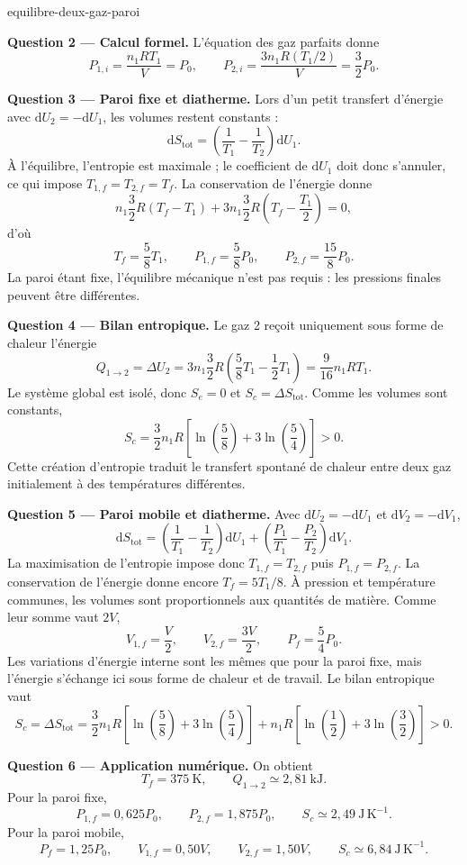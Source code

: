 \begin{exo}{equilibre-deux-gaz-paroi}
\begin{solution}
\textbf{Question 2 --- Calcul formel.} L'équation des gaz parfaits donne
\[
P_{1,i}=\frac{n_1RT_1}{V}=P_0,
\qquad
P_{2,i}=\frac{3n_1R(T_1/2)}{V}=\frac32P_0.
\]

\textbf{Question 3 --- Paroi fixe et diatherme.} Lors d'un petit transfert
d'énergie avec $\mathrm{d}U_2=-\mathrm{d}U_1$, les volumes restent constants :
\[
\mathrm{d}S_{\mathrm{tot}}
=\left(\frac1{T_1}-\frac1{T_2}\right)\mathrm{d}U_1.
\]
À l'équilibre, l'entropie est maximale ; le coefficient de
$\mathrm{d}U_1$ doit donc s'annuler, ce qui impose
$T_{1,f}=T_{2,f}=T_f$. La conservation de l'énergie donne
\[
n_1\frac32R(T_f-T_1)
+3n_1\frac32R\left(T_f-\frac{T_1}{2}\right)=0,
\]
d'où
\[
T_f=\frac58T_1,
\qquad
P_{1,f}=\frac58P_0,
\qquad
P_{2,f}=\frac{15}{8}P_0.
\]
La paroi étant fixe, l'équilibre mécanique n'est pas requis : les pressions
finales peuvent être différentes.

\textbf{Question 4 --- Bilan entropique.} Le gaz 2 reçoit uniquement sous
forme de chaleur l'énergie
\[
Q_{1\to2}=\Delta U_2
=3n_1\frac32R\left(\frac58T_1-\frac12T_1\right)
=\frac9{16}n_1RT_1.
\]
Le système global est isolé, donc $S_e=0$ et $S_c=\Delta S_{\mathrm{tot}}$.
Comme les volumes sont constants,
\[
S_c
=\frac32n_1R\left[
\ln\!\left(\frac58\right)
+3\ln\!\left(\frac54\right)
\right]>0.
\]
Cette création d'entropie traduit le transfert spontané de chaleur entre deux
gaz initialement à des températures différentes.

\textbf{Question 5 --- Paroi mobile et diatherme.} Avec
$\mathrm{d}U_2=-\mathrm{d}U_1$ et $\mathrm{d}V_2=-\mathrm{d}V_1$,
\[
\mathrm{d}S_{\mathrm{tot}}
=\left(\frac1{T_1}-\frac1{T_2}\right)\mathrm{d}U_1
+\left(\frac{P_1}{T_1}-\frac{P_2}{T_2}\right)\mathrm{d}V_1.
\]
La maximisation de l'entropie impose donc $T_{1,f}=T_{2,f}$ puis
$P_{1,f}=P_{2,f}$. La conservation de l'énergie donne encore
$T_f=5T_1/8$. À pression et température communes, les volumes sont
proportionnels aux quantités de matière. Comme leur somme vaut $2V$,
\[
V_{1,f}=\frac V2,
\qquad
V_{2,f}=\frac{3V}{2},
\qquad
P_f=\frac54P_0.
\]
Les variations d'énergie interne sont les mêmes que pour la paroi fixe, mais
l'énergie s'échange ici sous forme de chaleur et de travail. Le bilan
entropique vaut
\[
S_c=\Delta S_{\mathrm{tot}}
=\frac32n_1R\left[
\ln\!\left(\frac58\right)+3\ln\!\left(\frac54\right)
\right]
+n_1R\left[
\ln\!\left(\frac12\right)+3\ln\!\left(\frac32\right)
\right]>0.
\]

\textbf{Question 6 --- Application numérique.} On obtient
\[
T_f=375\ \mathrm{K},
\qquad
Q_{1\to2}\simeq2{,}81\ \mathrm{kJ}.
\]
Pour la paroi fixe,
\[
P_{1,f}=0{,}625P_0,
\qquad
P_{2,f}=1{,}875P_0,
\qquad
S_c\simeq2{,}49\ \mathrm{J\,K^{-1}}.
\]
Pour la paroi mobile,
\[
P_f=1{,}25P_0,
\qquad
V_{1,f}=0{,}50V,
\qquad
V_{2,f}=1{,}50V,
\qquad
S_c\simeq6{,}84\ \mathrm{J\,K^{-1}}.
\]
\end{solution}
\end{exo}


